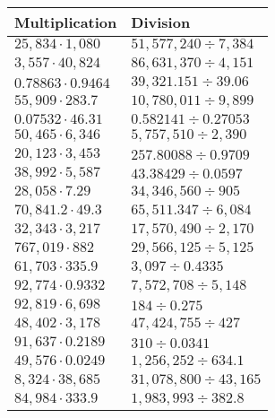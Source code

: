\begin{longtable}[]{@{}ll@{}}
\toprule
Multiplication & Division\tabularnewline
\midrule
\endhead
\(25,834\cdot1,080\) & \(51,577,240÷7,384\)\tabularnewline
\(3,557\cdot40,824\) & \(86,631,370 ÷4,151\)\tabularnewline
\(0.78863\cdot0.9464\) & \(39,321.151 ÷39.06\)\tabularnewline
\(55,909\cdot283.7\) & \(10,780,011÷9,899\)\tabularnewline
\(0.07532\cdot46.31\) & \(0.582141÷0.27053\)\tabularnewline
\(50,465\cdot6,346\) & \(5,757,510÷2,390\)\tabularnewline
\(20,123\cdot3,453\) & \(257.80088 ÷0.9709\)\tabularnewline
\(38,992\cdot5,587\) & \(43.38429÷0.0597\)\tabularnewline
\(28,058\cdot 7.29\) & \(34,346,560÷905\)\tabularnewline
\(70,841.2\cdot49.3\) & \(65,511.347÷6,084\)\tabularnewline
\(32,343\cdot3,217\) & \(17,570,490÷2,170\)\tabularnewline
\(767,019\cdot882\) & \(29,566,125÷5,125\)\tabularnewline
\(61,703\cdot335.9\) & \(3,097÷0.4335\)\tabularnewline
\(92,774\cdot0.9332\) & \(7,572,708÷5,148\)\tabularnewline
\(92,819\cdot 6,698\) & \(184÷0.275\)\tabularnewline
\(48,402\cdot3,178\) & \(47,424,755÷427\)\tabularnewline
\(91,637\cdot0.2189\) & \(310÷0.0341\)\tabularnewline
\(49,576\cdot0.0249\) & \(1,256,252÷634.1\)\tabularnewline
\(8,324\cdot38,685\) & \(31,078,800÷43,165\)\tabularnewline
\(84,984\cdot 333.9\) & \(1,983,993÷382.8\)\tabularnewline
\bottomrule
\end{longtable}
